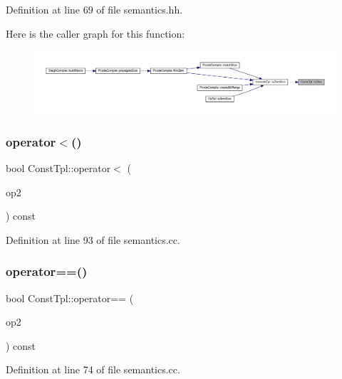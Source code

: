 Definition at line 69 of file semantics.\+hh.

Here is the caller graph for this function\+:
\nopagebreak
\begin{figure}[H]
\begin{center}
\leavevmode
\includegraphics[width=350pt]{class_const_tpl_a544ad1f2c43673e6975da4872003626f_icgraph}
\end{center}
\end{figure}
\mbox{\label{class_const_tpl_a6b340db27f3077b7e618e7b0e23e98ce}} 
\subsubsection{\texorpdfstring{operator$<$()}{operator<()}}
{\footnotesize\ttfamily bool Const\+Tpl\+::operator$<$ (\begin{DoxyParamCaption}\item[{const \mbox{\hyperlink{class_const_tpl}{Const\+Tpl}} \&}]{op2 }\end{DoxyParamCaption}) const}



Definition at line 93 of file semantics.\+cc.

\mbox{\label{class_const_tpl_a6476d76ec2c6e32dc8dc47f96b45ac8f}} 
\subsubsection{\texorpdfstring{operator==()}{operator==()}}
{\footnotesize\ttfamily bool Const\+Tpl\+::operator== (\begin{DoxyParamCaption}\item[{const \mbox{\hyperlink{class_const_tpl}{Const\+Tpl}} \&}]{op2 }\end{DoxyParamCaption}) const}



Definition at line 74 of file semantics.\+cc.

